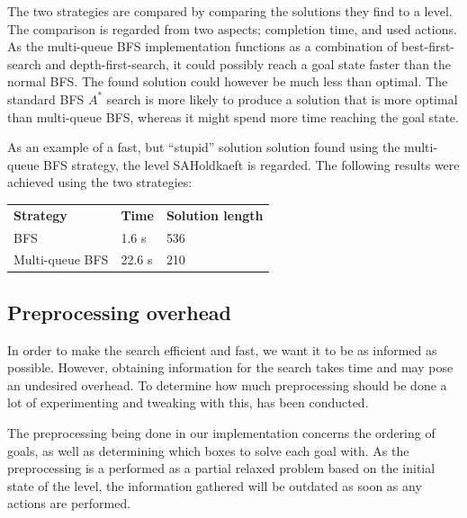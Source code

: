 \documentclass[Main]{subfiles}
\begin{document}
The two strategies are compared by comparing the solutions they find to a level. The comparison is regarded from two aspects; completion time, and used actions. As the multi-queue BFS implementation functions as a combination of best-first-search and depth-first-search, it could possibly reach a goal state faster than the normal BFS. The found solution could however be much less than optimal. The standard BFS $A^*$ search is more likely to produce a solution that is more optimal than multi-queue BFS, whereas it might spend more time reaching the goal state. 

As an example of a fast, but ``stupid'' solution solution found using the multi-queue BFS strategy, the level SAHoldkaeft is regarded. The following results were achieved using the two strategies:

\begin{table}[h]
\begin{tabular}{lll}
\rowcolor{grayish}
\textbf{Strategy} & \textbf{Time} & \textbf{Solution length} \\   %
BFS             & 1.6 s        & 536                       \\    %
Multi-queue BFS & 22.6 s       & 210                       %
\end{tabular}
\end{table}





\subsection{Preprocessing overhead}

In order to make the search efficient and fast, we want it to be as informed as possible. However, obtaining information for the search takes time and may pose an undesired overhead. To determine how much preprocessing should be done a lot of experimenting and tweaking with this, has been conducted. 

The preprocessing being done in our implementation concerns the ordering of goals, as well as determining which boxes to solve each goal with. As the preprocessing is a performed as a partial relaxed problem based on the initial state of the level, the information gathered will be outdated as soon as any actions are performed. 
\end{document}
